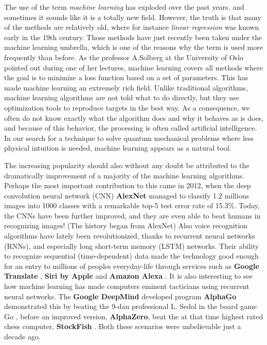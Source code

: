 The use of the term \textit{machine learning} has exploded over the past years, and sometimes it sounds like it is a totally new field. However, the truth is that many of the methods are relatively old, where for instance \textit{linear regression} was known early in the 19th century. \cite{legendre_nouvelles_1805, gauss_theoria_1809} Those methods have just recently been taken under the machine learning umbrella, which is one of the reasons why the term is used more frequently than before. As the professor A.Solberg at the University of Oslo pointed out during one of her lectures, machine learning covers all methods where the goal is to minimize a loss function based on a set of parameters. This has made machine learning an extremely rich field. Unlike traditional algorithms, machine learning algorithms are not told what to do directly, but they use optimization tools to reproduce targets in the best way. As a consequence, we often do not know exactly what the algorithm does and why it behaves as is does, and because of this behavior, the processing is often called artificial intelligence. In our search for a technique to solve quantum mechanical problems where less physical intuition is needed, machine learning appears as a natural tool.

The increasing popularity should also without any doubt be attributed to the dramatically improvement of a majority of the machine learning algorithms. Perhaps the most important contribution to this came in 2012, when the deep convolution neural network (CNN) \textbf{AlexNet} managed to classify 1.2 millions images into 1000 classes with a remarkable top-5 test error rate of 15.3\%. \cite{krizhevsky_imagenet_2012} Today, the CNNs have been further improved, and they are even able to beat humans in recognizing images! (The history began from AlexNet) Also voice recognition algorithms have lately been revolutionized, thanks to recurrent neural networks (RNNs), and especially long short-term memory (LSTM) networks. Their ability to recognize sequential (time-dependent) data made the technology good enough for an entry to millions of peoples everyday-life through services such as \textbf{Google Translate} \cite{wu_googles_2016}, \textbf{Siri by Apple} \cite{smith_ios_2016} and \textbf{Amazon Alexa} \cite{noauthor_bringing_nodate}. It is also interesting to see how machine learning has made computers eminent tacticians using recurrent neural networks. The \textbf{Google DeepMind} developed program \textbf{AlphaGo} demonstrated this by beating the 9-dan professional L. Sedol in the board game Go \cite{noauthor_alphago_nodate}, before an improved version, \textbf{AlphaZero}, beat the at that time highest rated chess computer, \textbf{StockFish} \cite{klein_mikeklein_googles_nodate}. Both these scenarios were unbelievable just a decade ago.

